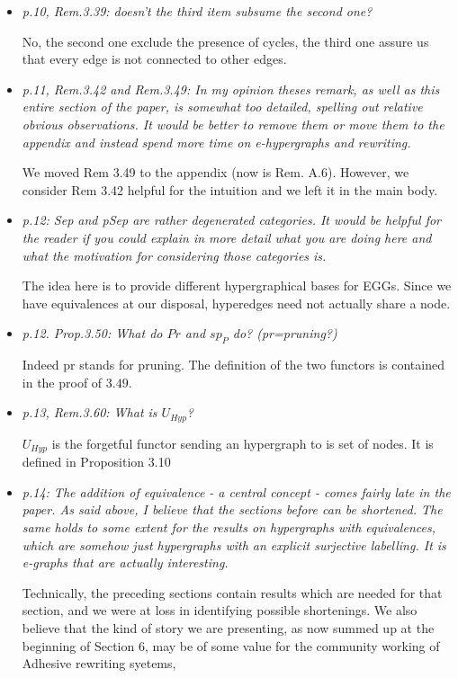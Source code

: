 \documentclass[english,11pt,a4paper]{article}
\begin{document}
\begin{itemize}
	\item \emph{ p.10, Rem.3.39: doesn't the third item subsume the second one?}
	
	No, the second one exclude the presence of cycles, the third one assure us that every edge is not connected to other edges. 
	
	\item \emph{ p.11, Rem.3.42 and Rem.3.49: In my opinion theses remark, as well as
		this entire section of the paper, is somewhat too detailed, spelling
		out relative obvious observations. It would be better to remove them
		or move them to the appendix and instead spend more time on
		e-hypergraphs and rewriting.}
	
	We moved Rem 3.49 to the appendix (now is Rem. A.6). However, we consider Rem 3.42 helpful for the intuition and we left it in the main body.
	
	\item \emph{ p.12: Sep and pSep are rather degenerated categories. It would be
		helpful for the reader if you could explain in more detail what you
		are doing here and what the motivation for considering those categories
		is.}
	
	The idea here is to provide different hypergraphical bases for EGGs. Since we have equivalences at our disposal, hyperedges need not actually share a node.
	
	\item \emph{ p.12. Prop.3.50: What do $Pr$ and $sp_P$ do? (pr=pruning?)}
		
		Indeed pr stands for pruning. The definition of the two functors is contained in the proof of $3.49$.
		
		\item \emph{ p.13, Rem.3.60: What is $U_{Hyp}$?}
		
		$U_{Hyp}$ is the forgetful functor sending an hypergraph to is set of nodes. It is defined in  Proposition 3.10
		
		\item \emph{ p.14: The addition of equivalence - a central concept - comes fairly
			late in the paper. As said above, I believe that the sections
			before can be shortened. The same holds to some extent for the
			results on hypergraphs with equivalences, which are somehow just
			hypergraphs with an explicit surjective labelling. It is e-graphs
			that are actually interesting.}
		
		Technically, the preceding sections contain results which are needed for that section, and we were at loss in identifying possible
		shortenings. We also believe that the kind of story we are presenting, as now summed up at the beginning of Section 6, may be 
		of some value for the community working of Adhesive rewriting syetems,
		

\end{itemize}
\end{document}
